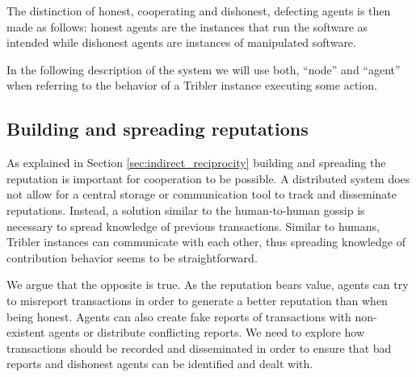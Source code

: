 The distinction of honest, cooperating and dishonest, defecting agents is then made as follows: honest agents are the 
instances that run the software as intended while dishonest agents are instances of manipulated 
software. 

In the following description of the system we will use both, ``node'' and ``agent'' when referring to the 
behavior of a Tribler instance executing some action. 

\subsection{Building and spreading reputations}
As explained in Section \ref{sec:indirect_reciprocity} building and spreading the reputation is 
important for cooperation to be possible. A distributed system does not allow for a central storage
or communication tool to track and disseminate reputations. Instead, a solution similar to the
human-to-human gossip is necessary to spread knowledge of previous transactions. Similar to humans, 
Tribler instances can communicate with each other, thus spreading knowledge of contribution behavior
seems to be straightforward. 

We argue that the opposite is true. As the reputation bears value, agents can try to misreport 
transactions in order to generate a better reputation than when being honest. Agents can also create
fake reports of transactions with non-existent agents or distribute conflicting reports. We need to
explore how transactions should be recorded and disseminated in order to ensure that bad 
reports and dishonest agents can be identified and dealt with.



